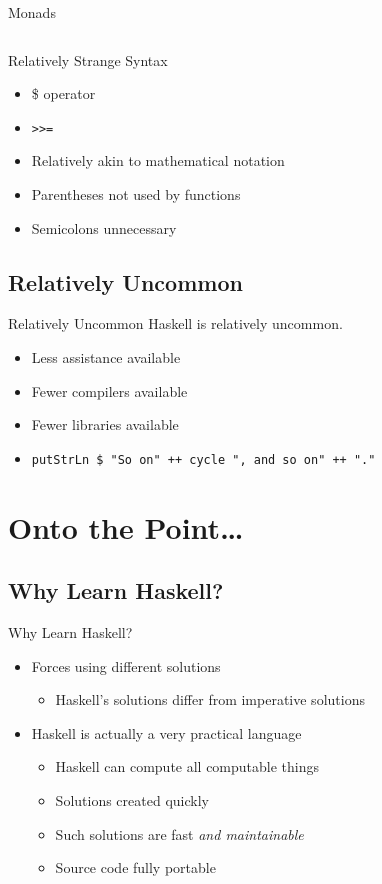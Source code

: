 \documentclass{beamer}
\begin{document}
\begin{frame}{Monads}
\begin{columns}
\begin{column}{0.25\textwidth}
					\end{column}
				\end{columns}
			\end{frame}
			\begin{frame}{Relatively Strange Syntax}
				\begin{itemize}
					\item \$ operator
					\item \texttt{>>=}
					\item Relatively akin to mathematical notation
					\item Parentheses not used by functions
					\item Semicolons unnecessary
				\end{itemize}
			\end{frame}
		\subsection{Relatively Uncommon}
			\begin{frame}{Relatively Uncommon}
				Haskell is relatively uncommon.
				\begin{itemize}
					\item Less assistance available
					\item Fewer compilers available
					\item Fewer libraries available
					\item \texttt{putStrLn \$ "So on" ++ cycle ", and so on" ++ "."}
				\end{itemize}
			\end{frame}
	\section{Onto the Point\dots}
		\subsection{Why Learn Haskell?}
			\begin{frame}{Why Learn Haskell?}
				\begin{itemize}
					\item Forces using different solutions
					\begin{itemize}
						\item Haskell's solutions differ from imperative solutions
					\end{itemize}
					\item Haskell is actually a very practical language
					\begin{itemize}
						\item Haskell can compute all computable things
						\item Solutions created quickly
						\item Such solutions are fast \textit{and maintainable}
						\item Source code fully portable
					\end{itemize}
				\end{itemize}
			\end{frame}
\end{document}
